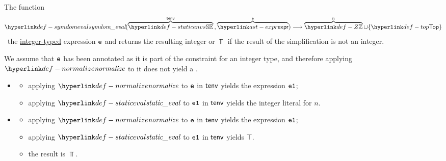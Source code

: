\begin{mathpar}
\end{mathpar}

\hypertarget{def-symdomeval}{}
The function
\[
\symdomeval(
  \overname{\staticenvs}{\tenv} \aslsep
  \overname{\expr}{\ve}
) \aslto \overname{\Z}{n} \cup \{\Top\}
\]
\symbolicallysimplifies\ the \underline{integer-typed} expression $\ve$ and returns the resulting integer or $\Top$ if
the result of the simplification is not an integer.

We assume that $\ve$ has been annotated as it is part of the constraint for an integer type,
and therefore applying $\normalize$ to it does not yield a \typingerrorterm{}.

\ProseParagraph
\OneApplies
\begin{itemize}
  \item {}
  \begin{itemize}
    \item applying $\normalize$ to $\ve$ in $\tenv$ yields the expression $\veone$;
    \item applying $\staticeval$ to $\veone$ in $\tenv$ yields the integer literal for $n$.
  \end{itemize}

  \item {}
  \begin{itemize}
    \item applying $\normalize$ to $\ve$ in $\tenv$ yields the expression $\veone$;
    \item applying $\staticeval$ to $\veone$ in $\tenv$ yields $\top$.
    \item the result is $\Top$.
  \end{itemize}
\end{itemize}

\FormallyParagraph
{}

